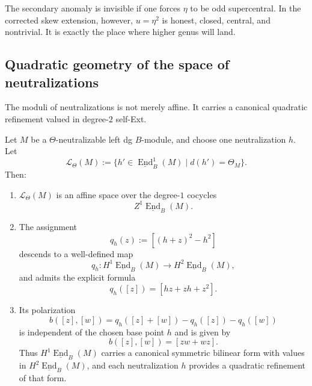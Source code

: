 \begin{remark}
The secondary anomaly is invisible if one forces \(\eta\) to be odd supercentral.
In the corrected skew extension, however, \(u=\eta^{2}\) is honest, closed, central, and nontrivial.
It is exactly the place where higher genus will land.
\end{remark}

\subsection{Quadratic geometry of the space of neutralizations}

The moduli of neutralizations is not merely affine.
It carries a canonical quadratic refinement valued in degree-\(2\) self-Ext.

\begin{theorem}
Let \(M\) be a \(\Theta\)-neutralizable left dg \(B\)-module, and choose one neutralization \(h\).
Let
\[
\mathcal{L}_{\Theta}(M)
:=
\big\{
h'\in \underline{\operatorname{End}}^{1}_{B}(M)\;\big|\;
d(h')=\Theta_{M}
\big\}.
\]
Then:
\begin{enumerate}
\item \(\mathcal{L}_{\Theta}(M)\) is an affine space over the degree-\(1\) cocycles
\[
Z^{1}\underline{\operatorname{End}}_{B}(M).
\]
\item The assignment
\[
q_{h}(z):=[(h+z)^{2}-h^{2}]
\]
descends to a well-defined map
\[
q_{h}:H^{1}\underline{\operatorname{End}}_{B}(M)\longrightarrow
H^{2}\underline{\operatorname{End}}_{B}(M),
\]
and admits the explicit formula
\[
q_{h}([z])=[hz+zh+z^{2}].
\]
\item Its polarization
\[
b([z],[w])
=
q_{h}([z]+[w])-q_{h}([z])-q_{h}([w])
\]
is independent of the chosen base point \(h\) and is given by
\[
b([z],[w])=[zw+wz].
\]
Thus \(H^{1}\underline{\operatorname{End}}_{B}(M)\) carries a canonical symmetric bilinear form with values in \(H^{2}\underline{\operatorname{End}}_{B}(M)\), and each neutralization \(h\) provides a quadratic refinement of that form.
\end{enumerate}
\end{theorem}

